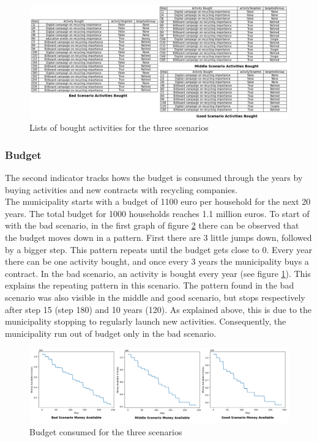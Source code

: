 \begin{figure}[H]
    \centering
        \captionsetup{width=\linewidth}
        \includegraphics[width=1.0\linewidth]{Images/Activity_tables.png}
        \caption{Lists of bought activities for the three scenarios}
    \label{fig:Activity_tables}
\end{figure}

\subsubsection{Budget}
\noindent The second indicator tracks hows the budget is consumed through the years by buying activities and new contracts with recycling companies. \\

\noindent The municipality starts with a budget of 1100 euro per household for the next 20 years. The total budget for 1000 households reaches 1.1 million euros. To start of with the bad scenario, in the first graph of figure \ref{fig:Budget_graph} there can be observed that the budget moves down in a pattern. First there are 3 little jumps down, followed by a bigger step. This pattern repeats until the budget gets close to 0. Every year there can be one activity bought, and once every 3 years the municipality buys a contract. In the bad scenario, an activity is bought every year (see figure \ref{fig:Activity_tables}). This explains the repeating pattern in this scenario. The pattern found in the bad scenario was also visible in the middle and good scenario, but stops respectively after step 15 (step 180) and 10 years (120). As explained above, this is due to the municipality stopping to regularly launch new activities. Consequently, the municipality run out of budget only in the bad scenario. \\

\begin{figure}[H]
    \centering
        \captionsetup{width=\linewidth}
        \includegraphics[width=1.0\linewidth]{Images/Budget_graphs.png}
        \caption{Budget consumed for the three scenarios}
    \label{fig:Budget_graph}
\end{figure}

